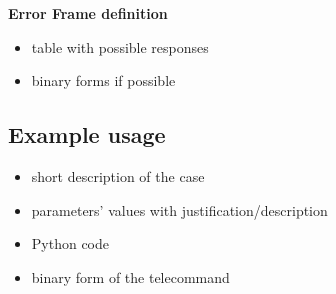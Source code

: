     \textbf{Error Frame definition}
    \begin{itemize}
        \item table with possible responses
        \item binary forms if possible
    \end{itemize}


\subsection{Example usage}

\begin{itemize}
    \item short description of the case
    \item parameters' values with justification/description
    \item Python code
    \item binary form of the telecommand
\end{itemize}
